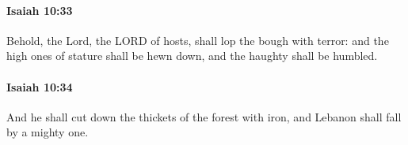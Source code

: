 		\paragraph{Isaiah 10:33} %
			\label{ISAIAH-10-33}

			Behold, the Lord, the LORD of hosts, shall lop the bough with terror: and the high ones of stature shall be hewn down, and the haughty shall be humbled.


		\paragraph{Isaiah 10:34} %
			\label{ISAIAH-10-34}

			And he shall cut down the thickets of the forest with iron, and Lebanon shall fall by a mighty one.

